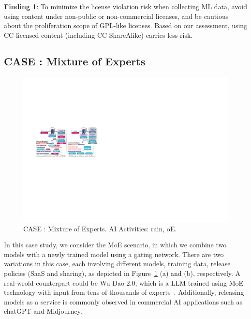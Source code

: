 \begin{tcolorbox}
\textbf{Finding 1}: To minimize the license violation risk when collecting ML data, avoid using content under non-public or non-commercial licenses, and be cautious about the proliferation scope of GPL-like licenses.
Based on our assessment, using CC-licensed content (including CC ShareAlike) carries less risk.
\end{tcolorbox}

\subsection{CASE  : Mixture of Experts}

\begin{figure}[h]
    \centering
    \includegraphics[width=\linewidth]{fig/case2.pdf}
    \caption{CASE : Mixture of Experts. AI Activities: rain, oE.}
    \Description{}
    \label{fig:case2}
\end{figure}

In this case study, we consider the MoE scenario, in which we combine two models with a newly trained model using a gating network.
There are two variations in this case, each involving different models, training data, release policies (SaaS and sharing), as depicted in Figure~\ref{fig:case2} (a) and (b), respectively.
A real-wrold counterpart could be Wu Dao 2.0, which is a LLM trained using MoE technology with input from tens of thousands of experts~\cite{he2022fastermoe}.
Additionally, releasing models as a service is commonly observed in commercial AI applications such as chatGPT and Midjourney.

